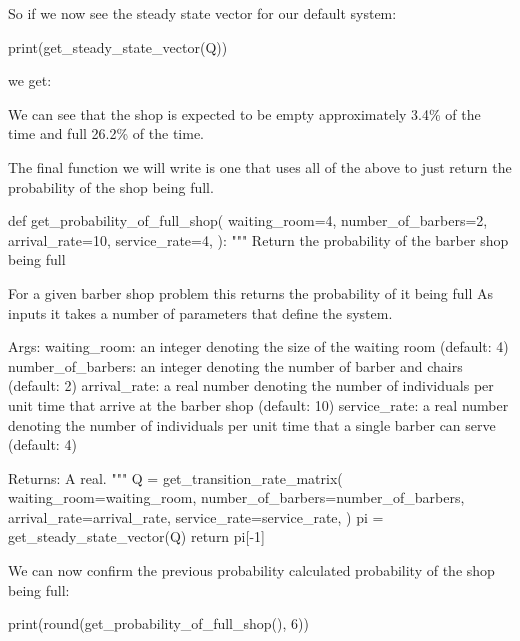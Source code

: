 So if we now see the steady state vector for our default system:

\begin{pyin}
print(get_steady_state_vector(Q))
\end{pyin}

we get:

\begin{pyout}
[0.03430888 0.0857722  0.10721525 0.13401906 0.16752383 0.20940479
 0.26175598]
\end{pyout}

We can see that the shop is expected to be empty approximately 3.4\% of the time
and full 26.2\% of the time.

The final function we will write is one that uses all of
the above to just return the probability of the shop being full.

\begin{pyin}
def get_probability_of_full_shop(
    waiting_room=4,
    number_of_barbers=2,
    arrival_rate=10,
    service_rate=4,
):
    """
    Return the probability of the barber shop being full

    For a given barber shop problem this returns the probability of it being full
    As inputs it takes a number of parameters that define the system.

    Args:
        waiting_room: an integer denoting the size of the waiting room
                      (default: 4)
        number_of_barbers: an integer denoting the number of barber and chairs
                           (default: 2)
        arrival_rate: a real number denoting the number of individuals per
                      unit time that arrive at the barber shop (default: 10)
        service_rate: a real number denoting the number of individuals per unit
                      time that a single barber can serve (default: 4)

    Returns:
        A real.
    """
    Q = get_transition_rate_matrix(
        waiting_room=waiting_room,
        number_of_barbers=number_of_barbers,
        arrival_rate=arrival_rate,
        service_rate=service_rate,
    )
    pi = get_steady_state_vector(Q)
    return pi[-1]
\end{pyin}

We can now confirm the previous probability calculated probability of the shop
being full:

\begin{pyin}
print(round(get_probability_of_full_shop(), 6))
\end{pyin}


